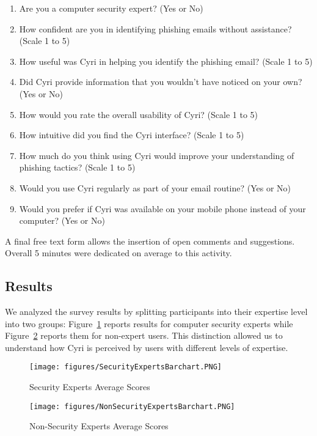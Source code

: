 \begin{enumerate}
    \item Are you a computer security expert? (Yes or No)
    \item How confident are you in identifying phishing emails without assistance?  (Scale 1 to 5)
    \item How useful was Cyri in helping you identify the phishing email?  (Scale 1 to 5)
    \item Did Cyri provide information that you wouldn't have noticed on your own? (Yes or No)
    \item How would you rate the overall usability of Cyri? (Scale 1 to 5)
    \item How intuitive did you find the Cyri interface?  (Scale 1 to 5)
    \item How much do you think using Cyri would improve your understanding of phishing tactics? (Scale 1 to 5)
    \item Would you use Cyri regularly as part of your email routine?  (Yes or No)
    \item Would you prefer if Cyri was available on your mobile phone instead of your computer?  (Yes or No)
\end{enumerate}

A final free text form allows the insertion of open comments and suggestions. Overall 5 minutes were dedicated on average to this activity.

\subsection{Results}
\label{sec:userresults}

We analyzed the survey results by splitting participants into their expertise level into two groups: Figure~\ref{fig:secexp} reports results for computer security experts while Figure~\ref{fig:nonsecexp} reports them for non-expert users. This distinction allowed us to understand how Cyri is perceived by users with different levels of expertise.

\begin{figure}[htbp]
  \centering
  \texttt{[image: figures/SecurityExpertsBarchart.PNG]}
  \caption{Security Experts Average Scores}
  \label{fig:secexp}
\end{figure}

\begin{figure}[htbp]
  \centering
  \texttt{[image: figures/NonSecurityExpertsBarchart.PNG]}
  \caption{Non-Security Experts Average Scores}
  \label{fig:nonsecexp}
\end{figure}

